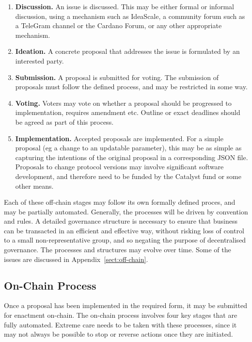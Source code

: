 \begin{enumerate}
\item
  \textbf{Discussion.}  An issue is discussed.  This may be either formal or informal discussion, using a mechanism such as IdeaScale, a community forum such as a TeleGram channel or the Cardano Forum,
  or any other appropriate mechanism.
\item
  \textbf{Ideation.}  A concrete proposal that addresses the issue is formulated by an interested party.
\item
  \textbf{Submission.}  A proposal is submitted for voting.  The submission of proposals must follow the defined process, and may be restricted in some way.
\item
  \textbf{Voting.}  Voters may vote on whether a proposal should be progressed to implementation, requires amendment etc.  Outline or exact deadlines should be agreed as part of this process.
\item
  \textbf{Implementation.}  Accepted proposals are implemented.  For a simple proposal (eg a change to an updatable parameter), this may be as simple as capturing the intentions of the original proposal in a corresponding JSON file.
  Proposals to change protocol versions may involve significant software development, and therefore need to be funded by the Catalyst fund or some other means.
\end{enumerate}

Each of these off-chain stages may follow its own formally defined proces, and may be partially automated.  Generally, the processes will be driven by convention and rules.  A detailed governance structure is necessary to ensure that business can
be transacted in an efficient and effective way, without risking loss of control to a small non-representative group, and so negating the purpose of decentralised governance.
The processes and structures may evolve over time.  Some of the issues are discussed in Appendix~\ref{sect:off-chain}.


\newpage
\subsection{On-Chain Process}

Once a proposal has been implemented in the required form, it may be submitted for enactment on-chain.  The on-chain process involves four key stages that are fully automated.  Extreme care needs to be taken with these processes,
since it may not always be possible to stop or reverse actions once they are initiated.

